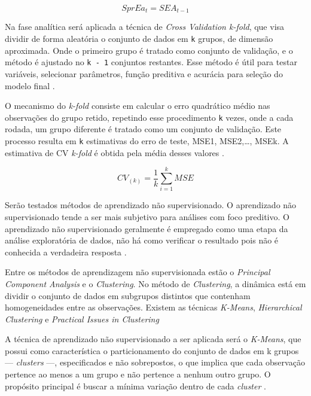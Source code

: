 \documentclass[
  12pt,
  12pt,
  openright,
  oneside,
  a4paper,
  chapter=TITLE,
  section=TITLE,
  subsection=TITLE,
  subsubsection=TITLE,
  english,
  portugues,
  sumario=tradicional]{abntex2}
\begin{document}
\begin{equation}
SprEa_{t} = SEA_{t-1}
\end{equation}

Na fase analítica será aplicada a técnica de \emph{Cross Validation k-fold}, que visa dividir de forma aleatória o conjunto de dados em \texttt{k} grupos, de dimensão aproximada. Onde o primeiro grupo é tratado como conjunto de validação, e o método é ajustado no \texttt{k\ -\ 1} conjuntos restantes. Esse método é útil para testar variáveis, selecionar parâmetros, função preditiva e acurácia para seleção do modelo final \cite{gareth:2017}.

O mecanismo do \emph{k-fold} consiste em calcular o erro quadrático médio nas observações do grupo retido, repetindo esse procedimento \texttt{k} vezes, onde a cada rodada, um grupo diferente é tratado como um conjunto de validação. Este processo resulta em \texttt{k} estimativas do erro de teste, MSE1, MSE2,\ldots, MSEk. A estimativa de CV \emph{k-fold} é obtida pela média desses valores \cite{gareth:2017}.

\begin{equation}
CV_{(k)} = \frac{1}{k}\sum_{i=1}^{k}MSE  
\end{equation}

Serão testados métodos de aprendizado não supervisionado. O aprendizado não supervisionado tende a ser mais subjetivo para análises com foco preditivo. O aprendizado não supervisionado geralmente é empregado como uma etapa da análise exploratória de dados, não há como verificar o resultado pois não é conhecida a verdadeira resposta \cite{gareth:2017}.

Entre os métodos de aprendizagem não supervisionada estão o \emph{Principal Component Analysis} e o \emph{Clustering}. No método de \emph{Clustering}, a dinâmica está em dividir o conjunto de dados em subgrupos distintos que contenham homogeneidades entre as observações. Existem as técnicas \emph{K-Means}, \emph{Hierarchical Clustering} e \emph{Practical Issues in Clustering} \cite{gareth:2017}

A técnica de aprendizado não supervisionado a ser aplicada será o \emph{K-Means}, que possui como característica o particionamento do conjunto de dados em k grupos --- \emph{clusters} ---, especificados e não sobrepostos, o que implica que cada observação pertence ao menos a um grupo e não pertence a nenhum outro grupo. O propósito principal é buscar a mínima variação dentro de cada \emph{cluster} \cite{gareth:2017}.
\end{document}

